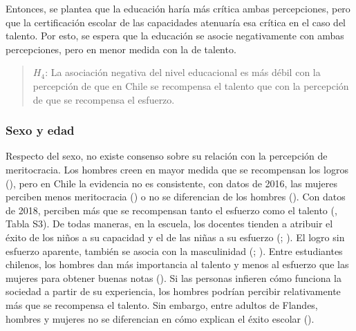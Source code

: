 \documentclass[
  spanish,
  a4paper,
  oneside]{scrbook}
\begin{document}
Entonces, se plantea que la educación haría más crítica ambas
percepciones, pero que la certificación escolar de las capacidades
atenuaría esa crítica en el caso del talento. Por esto, se espera que la
educación se asocie negativamente con ambas percepciones, pero en menor
medida con la de talento.

\begin{quote}
\(H_4\): La asociación negativa del nivel educacional es más débil con
la percepción de que en Chile se recompensa el talento que con la
percepción de que se recompensa el esfuerzo.
\end{quote}

\subsubsection{Sexo y edad}\label{sexo-y-edad}

Respecto del sexo, no existe consenso sobre su relación con la
percepción de meritocracia. Los hombres creen en mayor medida que se
recompensan los logros
(), pero en Chile la evidencia no es consistente, con datos de
2016, las mujeres perciben menos meritocracia
() o no se
diferencian de los hombres
(). Con datos de 2018, perciben más que se recompensan tanto el
esfuerzo como el talento
(, Tabla S3). De todas maneras, en la escuela, los docentes tienden
a atribuir el éxito de los niños a su capacidad y el de las niñas a su
esfuerzo
(;
).
El logro sin esfuerzo aparente, también se asocia con la masculinidad
(;
).
Entre estudiantes chilenos, los hombres dan más importancia al talento y
menos al esfuerzo que las mujeres para obtener buenas notas
(). Si las
personas infieren cómo funciona la sociedad a partir de su experiencia,
los hombres podrían percibir relativamente más que se recompensa el
talento. Sin embargo, entre adultos de Flandes, hombres y mujeres no se
diferencian en cómo explican el éxito escolar
().
\end{document}
